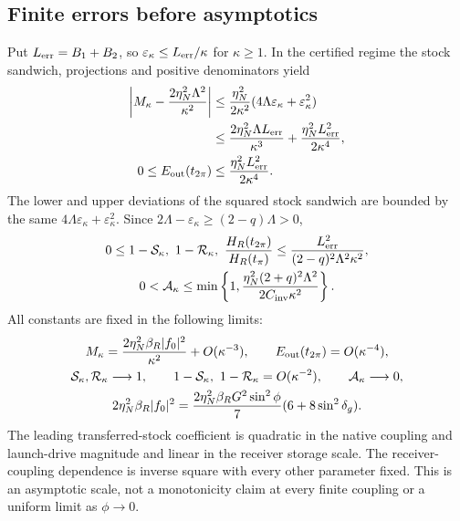 \subsection{Finite errors before asymptotics}
Put $L_{\rm err}=B_1+B_2$, so $\varepsilon_\kappa\le L_{\rm err}/\kappa$ for $\kappa\ge1$. In the certified regime the stock sandwich, projections and positive denominators yield
\begin{equation}\label{eq:finiteamount}%
\begin{aligned}
\left|M_\kappa-\frac{2\eta_N^2\Lambda^2}{\kappa^2}\right|
&\le\frac{\eta_N^2}{2\kappa^2}(4\Lambda\varepsilon_\kappa+\varepsilon_\kappa^2)\\
&\le\frac{2\eta_N^2\Lambda L_{\rm err}}{\kappa^3}
+\frac{\eta_N^2L_{\rm err}^2}{2\kappa^4},\\
0\le E_{\rm out}(t_{2\pi})&\le\frac{\eta_N^2L_{\rm err}^2}{2\kappa^4}.
\end{aligned}
\end{equation}
The lower and upper deviations of the squared stock sandwich are bounded by the same $4\Lambda\varepsilon_\kappa+\varepsilon_\kappa^2$. Since $2\Lambda-\varepsilon_\kappa\ge(2-q)\Lambda>0$,
\begin{equation}\label{eq:finiteratios}%
\begin{gathered}
0\le1-\mathcal S_\kappa,\ 1-\mathcal R_\kappa,\
\frac{H_R(t_{2\pi})}{H_R(t_\pi)}
\le\frac{L_{\rm err}^2}{(2-q)^2\Lambda^2\kappa^2},\\
0<\mathcal A_\kappa
\le\min\left\{1,\frac{\eta_N^2(2+q)^2\Lambda^2}{2C_{\rm inv}\kappa^2}\right\}.
\end{gathered}
\end{equation}
All constants are fixed in the following limits:
\begin{equation}\label{eq:asymptotics}%
\begin{gathered}
M_\kappa=\frac{2\eta_N^2\beta_R|f_0|^2}{\kappa^2}+O(\kappa^{-3}),\qquad
E_{\rm out}(t_{2\pi})=O(\kappa^{-4}),\\
\mathcal S_\kappa,\mathcal R_\kappa\longrightarrow1,\qquad
1-\mathcal S_\kappa,\ 1-\mathcal R_\kappa=O(\kappa^{-2}),\qquad
\mathcal A_\kappa\longrightarrow0,\\
2\eta_N^2\beta_R|f_0|^2
=\frac{2\eta_N^2\beta_RG^2\sin^2\phi}{7}(6+8\sin^2\delta_g).
\end{gathered}
\end{equation}
The leading transferred-stock coefficient is quadratic in the native coupling and launch-drive magnitude and linear in the receiver storage scale. The receiver-coupling dependence is inverse square with every other parameter fixed. This is an asymptotic scale, not a monotonicity claim at every finite coupling or a uniform limit as $\phi\to0$.

